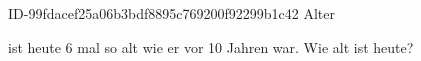 \begin{exercise}
      {ID-99fdacef25a06b3bdf8895c769200f92299b1c42}
      {Alter}
  \ifproblem\problem\par
    \xya{} ist heute 6 mal so alt wie er vor 10 Jahren war.
    Wie alt ist \xya{} heute?
  \fi
\end{exercise}
